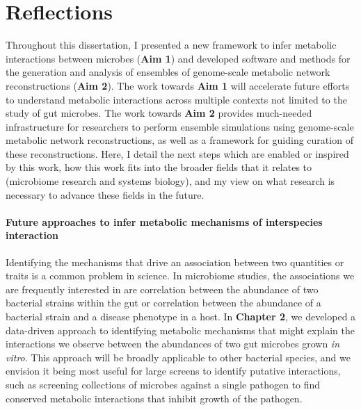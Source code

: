 \documentclass[11pt,onecolumn,notitlepage,openany,twoside]{book}
\begin{document}
\chapter{Reflections}
\begin{refsection}

Throughout this dissertation, I presented a new framework to infer metabolic interactions between microbes (\textbf{Aim 1}) and developed software and methods for the generation and analysis of ensembles of genome-scale metabolic network reconstructions (\textbf{Aim 2}). The work towards \textbf{Aim 1} will accelerate future efforts to understand metabolic interactions across multiple contexts not limited to the study of gut microbes. The work towards \textbf{Aim 2} provides much-needed infrastructure for researchers to perform ensemble simulations using genome-scale metabolic network reconstructions, as well as a framework for guiding curation of these reconstructions. Here, I detail the next steps which are enabled or inspired by this work, how this work fits into the broader fields that it relates to (microbiome research and systems biology), and my view on what research is necessary to advance these fields in the future.

\subsubsection{Future approaches to infer metabolic mechanisms of interspecies interaction}

Identifying the mechanisms that drive an association between two quantities or traits is a common problem in science. In microbiome studies, the associations we are frequently interested in are correlation between the abundance of two bacterial strains within the gut or correlation between the abundance of a bacterial strain and a disease phenotype in a host. In \textbf{Chapter 2}, we developed a data-driven approach to identifying metabolic mechanisms that might explain the interactions we observe between the abundances of two gut microbes grown \textit{in vitro}. This approach will be broadly applicable to other bacterial species, and we envision it being most useful for large screens to identify putative interactions, such as screening collections of microbes against a single pathogen to find conserved metabolic interactions that inhibit growth of the pathogen.


\end{refsection}
\end{document}
